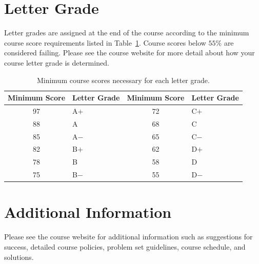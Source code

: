 \documentclass[letterpaper,oneside,onecolumn,11pt,article]{memoir}
\begin{document}
\section{Letter Grade}
Letter grades are assigned at the end of the course according to the minimum course score requirements listed in Table~\ref{tab:lettergrades}. Course scores below $55\%$ are considered failing. Please see the course website for more detail about how your course letter grade is determined. 
\begin{table}[h]
\caption{\sffamily Minimum course scores necessary for each letter grade.}
\label{tab:lettergrades}
\begin{tabular}{cl||cl} \toprule
\textbf{Minimum Score} & \textbf{Letter Grade} & \textbf{Minimum Score} & \textbf{Letter Grade} \\ \hline
97 & \hspace{0.3in}A$+$ & 72 & \hspace{0.3in}C$+$ \\
88 & \hspace{0.3in}A & 68 & \hspace{0.3in}C \\
85 & \hspace{0.3in}A$-$ & 65 & \hspace{0.3in}C$-$ \\
82 & \hspace{0.3in}B$+$ & 62 & \hspace{0.3in}D$+$ \\
78 & \hspace{0.3in}B & 58 & \hspace{0.3in}D \\
75 & \hspace{0.3in}B$-$ & 55 & \hspace{0.3in}D$-$ \\
\bottomrule
\end{tabular}
\end{table}
%
%
\section{Additional Information}
Please see the course website for additional information such as suggestions for success, detailed course policies, problem set guidelines, course schedule, and solutions. 
%
%
\end{document}
